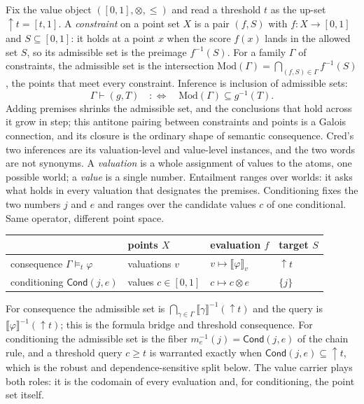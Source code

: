 \documentclass[11pt,a4paper]{article}
\newcommand{\Cond}{\mathsf{Cond}}
\newcommand{\conjc}{\otimes}
\newcommand{\val}[1]{\llbracket #1 \rrbracket}
\begin{document}
Fix the value object $([0,1],\conjc,\le)$ and read a threshold $t$ as
the up-set ${\uparrow}t=[t,1]$.  A \emph{constraint} on a point set $X$
is a pair $(f,S)$ with $f:X\to[0,1]$ and $S\subseteq[0,1]$: it holds at a
point $x$ when the score $f(x)$ lands in the allowed set $S$, so its
admissible set is the preimage $f^{-1}(S)$.  For a family $\Gamma$ of
constraints, the admissible set is the intersection
$\mathrm{Mod}(\Gamma)=\bigcap_{(f,S)\in\Gamma}f^{-1}(S)$, the points that
meet every constraint.  Inference is inclusion of admissible sets:
\[
\boxed{\;\Gamma\vdash(g,T)\quad:\Longleftrightarrow\quad
  \mathrm{Mod}(\Gamma)\subseteq g^{-1}(T).\;}
\]
Adding premises shrinks the admissible set, and the conclusions that
hold across it grow in step; this antitone pairing between constraints
and points is a Galois connection, and its closure is the ordinary
shape of semantic consequence.  Cred's two
inferences are its valuation-level and value-level instances, and the
two words are not synonyms.  A \emph{valuation} is a whole assignment of
values to the atoms, one possible world; a \emph{value} is a single
number.  Entailment ranges over worlds: it asks what holds in every
valuation that designates the premises.  Conditioning fixes the two
numbers $j$ and $e$ and ranges over the candidate values $c$ of one
conditional.  Same operator, different point space.
\begin{center}
\begin{tabular}{@{}llll@{}}
\toprule
 & points $X$ & evaluation $f$ & target $S$ \\
\midrule
consequence $\Gamma\models_t\varphi$ & valuations $v$ &
  $v\mapsto\val{\varphi}_v$ & ${\uparrow}t$ \\
conditioning $\Cond(j,e)$ & values $c\in[0,1]$ &
  $c\mapsto c\conjc e$ & $\{j\}$ \\
\bottomrule
\end{tabular}
\end{center}
For consequence the admissible set is
$\bigcap_{\gamma\in\Gamma}\val{\gamma}^{-1}({\uparrow}t)$ and the query
is $\val{\varphi}^{-1}({\uparrow}t)$; this is the formula bridge and
threshold consequence.  For conditioning the admissible set is the
fiber $m_e^{-1}(j)=\Cond(j,e)$ of the chain rule, and a threshold query
$c\ge t$ is warranted exactly when $\Cond(j,e)\subseteq{\uparrow}t$,
which is the robust and dependence-sensitive split below.  The value
carrier plays both roles: it is the codomain of every evaluation and,
for conditioning, the point set itself.
\end{document}
